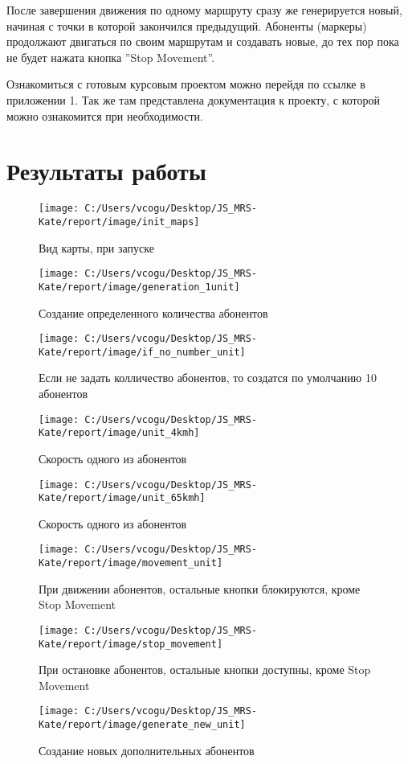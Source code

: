 \documentclass[a4paper]{article}
\begin{document}
\begin{onehalfspacing}
После завершения движения по одному маршруту сразу же генерируется новый, начиная с точки в которой закончился предыдущий. Абоненты (маркеры) продолжают двигаться по своим маршрутам и создавать новые, до тех пор пока не будет нажата кнопка ''Stop Movement''.

Ознакомиться с готовым курсовым проектом можно перейдя по ссылке в приложении 1. Так же там представлена документация к  проекту, с которой можно ознакомится при необходимости.

\clearpage


\section{Результаты работы}
\begin{figure}[h!]
	\centering
	\texttt{[image: C:/Users/vcogu/Desktop/JS\_MRS-Kate/report/image/init\_maps]}
	\caption{Вид карты, при запуске}
	\label{fig:mpr}
\end{figure}
\begin{figure}[h!]
	\centering
	\texttt{[image: C:/Users/vcogu/Desktop/JS\_MRS-Kate/report/image/generation\_1unit]}
	\caption{Создание определенного количества абонентов}
	\label{fig:mpr}
\end{figure}
\begin{figure}[h!]
	\centering
	\texttt{[image: C:/Users/vcogu/Desktop/JS\_MRS-Kate/report/image/if\_no\_number\_unit]}
	\caption{Если не задать колличество абонентов, то создатся по умолчанию 10 абонентов }
	\label{fig:mpr}
\end{figure}
\begin{figure}[h!]
	\centering
	\texttt{[image: C:/Users/vcogu/Desktop/JS\_MRS-Kate/report/image/unit\_4kmh]}
	\caption{Скорость одного из абонентов }
	\label{fig:mpr}
\end{figure}
\begin{figure}[h!]
	\centering
	\texttt{[image: C:/Users/vcogu/Desktop/JS\_MRS-Kate/report/image/unit\_65kmh]}
	\caption{Скорость одного из абонентов }
	\label{fig:mpr}
\end{figure}
\begin{figure}[h!]
	\centering
	\texttt{[image: C:/Users/vcogu/Desktop/JS\_MRS-Kate/report/image/movement\_unit]}
	\caption{При движении абонентов, остальные кнопки блокируются, кроме Stop Movement }
	\label{fig:mpr}
\end{figure}
\begin{figure}[h!]
	\centering
	\texttt{[image: C:/Users/vcogu/Desktop/JS\_MRS-Kate/report/image/stop\_movement]}
	\caption{При остановке абонентов, остальные кнопки доступны, кроме Stop Movement }
	\label{fig:mpr}
\end{figure}
\begin{figure}[h!]
	\centering
	\texttt{[image: C:/Users/vcogu/Desktop/JS\_MRS-Kate/report/image/generate\_new\_unit]}
	\caption{Создание новых дополнительных абонентов }
	\label{fig:mpr}
\end{figure}
\clearpage

\end{onehalfspacing}
\end{document}
